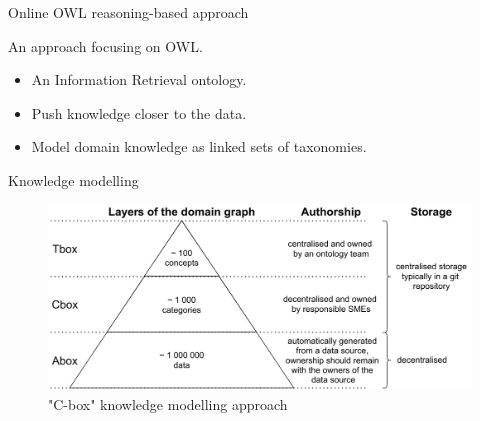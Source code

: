 \begin{frame}{Online OWL reasoning-based approach}

    An approach focusing on OWL.
    
    \begin{itemize}
        \item An Information Retrieval ontology.
        \item Push knowledge closer to the data.
        \item Model domain knowledge as linked sets of taxonomies. 
    \end{itemize}

\end{frame}

\begin{frame}{Knowledge modelling}

    \begin{figure} [H]
        \begin{center}
            \includegraphics[scale=0.5]{images/TboxAboxCboxLayers.pdf} 
            \caption{"C-box" knowledge modelling approach} 
        \end{center}
    \end{figure}

\end{frame}

